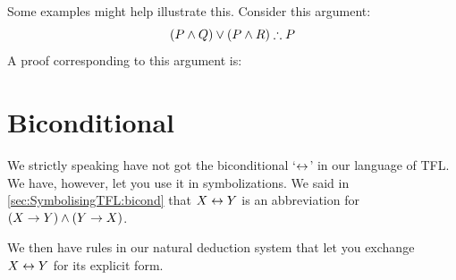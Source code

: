 Some examples might help illustrate this. Consider this argument:
$$(P \eand Q) \eor (P \eand R) \therefore P$$
A proof corresponding to this argument is:
	\begin{fitchproof}
			\open
			\close
			\open
			\close
	\end{fitchproof}







\section{Biconditional}

We strictly speaking have not got the biconditional `$\leftrightarrow$' in our language of TFL. We have, however, let you use it in symbolizations. We said in \cref{sec:SymbolisingTFL:bicond} that  $X\leftrightarrow Y$ is an abbreviation for  $(X\rightarrow Y)\mathbin{\wedge}(Y\rightarrow X)$.

We then have rules in our natural deduction system that let you exchange $X\leftrightarrow Y$ for its explicit form. 

\begin{highlighted}
	\begin{fitchproof}
		\ellipsesline
		\have[m]{ab}{\metaX\eiff\metaY}
		\ellipsesline
		\iffE{ab}
	\end{fitchproof}
	\begin{fitchproof}
		\ellipsesline
		\have[m]{a}{(\metaX\eif\metaY)\eand (\metaY\eif\metaX)}
		\ellipsesline
		\iffI{a}
	\end{fitchproof}
\end{highlighted}



